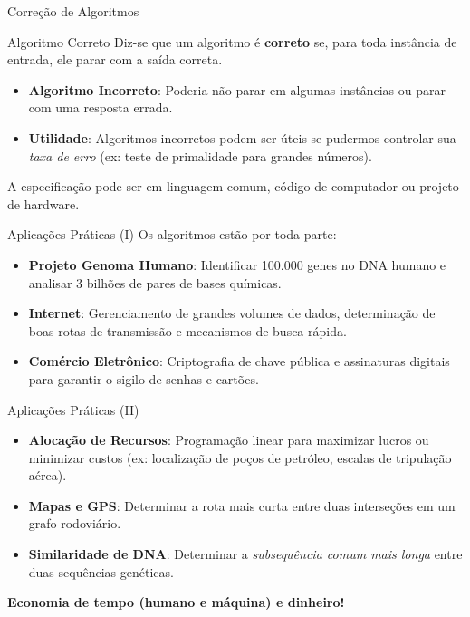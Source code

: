 \documentclass[9pt]{beamer}
\begin{document}
\begin{frame}{Correção de Algoritmos}
    \begin{block}{Algoritmo Correto}
        Diz-se que um algoritmo é \textbf{correto} se, para toda instância de entrada, ele parar com a saída correta.
    \end{block}
    \vspace{0.3cm}
    \begin{itemize}
        \item \textbf{Algoritmo Incorreto}: Poderia não parar em algumas instâncias ou parar com uma resposta errada.
        \item \textbf{Utilidade}: Algoritmos incorretos podem ser úteis se pudermos controlar sua \textit{taxa de erro} (ex: teste de primalidade para grandes números).
    \end{itemize}
    \vspace{0.3cm}
    A especificação pode ser em linguagem comum, código de computador ou projeto de hardware.
\end{frame}

\begin{frame}{Aplicações Práticas (I)}
    Os algoritmos estão por toda parte:
    \vspace{0.2cm}
    \begin{itemize}
        \item \textbf{Projeto Genoma Humano}: Identificar 100.000 genes no DNA humano e analisar 3 bilhões de pares de bases químicas.
        \item \textbf{Internet}: Gerenciamento de grandes volumes de dados, determinação de boas rotas de transmissão e mecanismos de busca rápida.
        \item \textbf{Comércio Eletrônico}: Criptografia de chave pública e assinaturas digitais para garantir o sigilo de senhas e cartões.
    \end{itemize}
\end{frame}

\begin{frame}{Aplicações Práticas (II)}
    \begin{itemize}
        \item \textbf{Alocação de Recursos}: Programação linear para maximizar lucros ou minimizar custos (ex: localização de poços de petróleo, escalas de tripulação aérea).
        \item \textbf{Mapas e GPS}: Determinar a rota mais curta entre duas interseções em um grafo rodoviário.
        \item \textbf{Similaridade de DNA}: Determinar a \textit{subsequência comum mais longa} entre duas sequências genéticas.
    \end{itemize}
    \vspace{0.3cm}
    \begin{center}
        \textbf{Economia de tempo (humano e máquina) e dinheiro!}
    \end{center}
\end{frame}
\end{document}
